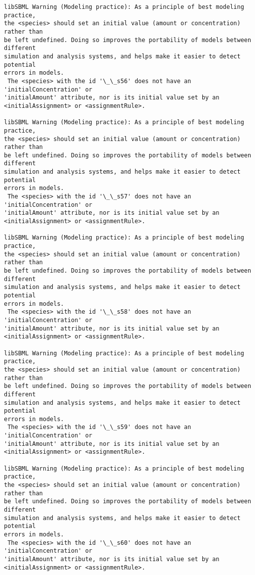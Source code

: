 \documentclass[11pt]{article}
\begin{document}
\begin{Verbatim}[commandchars=\\\{\}]
libSBML Warning (Modeling practice): As a principle of best modeling practice,
the <species> should set an initial value (amount or concentration) rather than
be left undefined. Doing so improves the portability of models between different
simulation and analysis systems, and helps make it easier to detect potential
errors in models.
 The <species> with the id '\_\_s56' does not have an 'initialConcentration' or
'initialAmount' attribute, nor is its initial value set by an
<initialAssignment> or <assignmentRule>.

libSBML Warning (Modeling practice): As a principle of best modeling practice,
the <species> should set an initial value (amount or concentration) rather than
be left undefined. Doing so improves the portability of models between different
simulation and analysis systems, and helps make it easier to detect potential
errors in models.
 The <species> with the id '\_\_s57' does not have an 'initialConcentration' or
'initialAmount' attribute, nor is its initial value set by an
<initialAssignment> or <assignmentRule>.

libSBML Warning (Modeling practice): As a principle of best modeling practice,
the <species> should set an initial value (amount or concentration) rather than
be left undefined. Doing so improves the portability of models between different
simulation and analysis systems, and helps make it easier to detect potential
errors in models.
 The <species> with the id '\_\_s58' does not have an 'initialConcentration' or
'initialAmount' attribute, nor is its initial value set by an
<initialAssignment> or <assignmentRule>.

libSBML Warning (Modeling practice): As a principle of best modeling practice,
the <species> should set an initial value (amount or concentration) rather than
be left undefined. Doing so improves the portability of models between different
simulation and analysis systems, and helps make it easier to detect potential
errors in models.
 The <species> with the id '\_\_s59' does not have an 'initialConcentration' or
'initialAmount' attribute, nor is its initial value set by an
<initialAssignment> or <assignmentRule>.

libSBML Warning (Modeling practice): As a principle of best modeling practice,
the <species> should set an initial value (amount or concentration) rather than
be left undefined. Doing so improves the portability of models between different
simulation and analysis systems, and helps make it easier to detect potential
errors in models.
 The <species> with the id '\_\_s60' does not have an 'initialConcentration' or
'initialAmount' attribute, nor is its initial value set by an
<initialAssignment> or <assignmentRule>.


\end{Verbatim}
\end{document}
